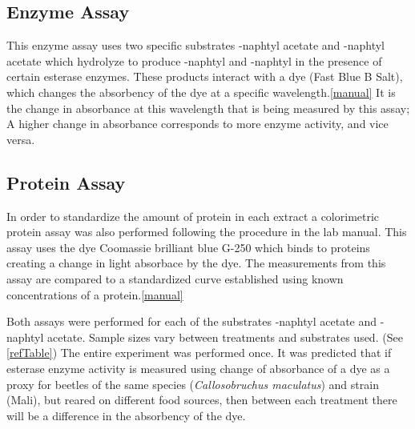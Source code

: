 \documentclass[12pt]{article}
\begin{document}
\subsection{Enzyme Assay}
	This enzyme assay uses two specific substrates \textalpha-naphtyl acetate and \textbeta-naphtyl acetate which hydrolyze to produce  \textalpha-naphtyl and \textbeta-naphtyl in the presence of certain esterase enzymes. These products interact with a dye (Fast Blue B Salt), which changes the absorbency of the dye at a specific wavelength.\cref{manual} It is the change in absorbance at this wavelength that is being measured by this assay; A higher change in absorbance corresponds to more enzyme activity, and vice versa.   
\subsection{Protein Assay}
	In order to standardize the amount of protein in each extract a colorimetric protein assay was also performed following the procedure in the lab manual. This assay uses the dye Coomassie brilliant blue G-250 which binds to proteins creating a change in light absorbace by the dye. The measurements from this assay are compared to a standardized curve established using known concentrations of a protein.\cref{manual}
	
	Both assays were performed for each of the substrates \textalpha-naphtyl acetate and \textbeta-naphtyl acetate. Sample sizes vary between treatments and substrates used. (See \cref{refTable}) The entire experiment was performed once. It was predicted that if esterase enzyme activity is measured using change of absorbance of a dye as a proxy for beetles of the same species (\textit{Callosobruchus maculatus}) and strain (Mali), but reared on different food sources, then between each treatment there will be a difference in the absorbency of the dye.
	
\end{document}
